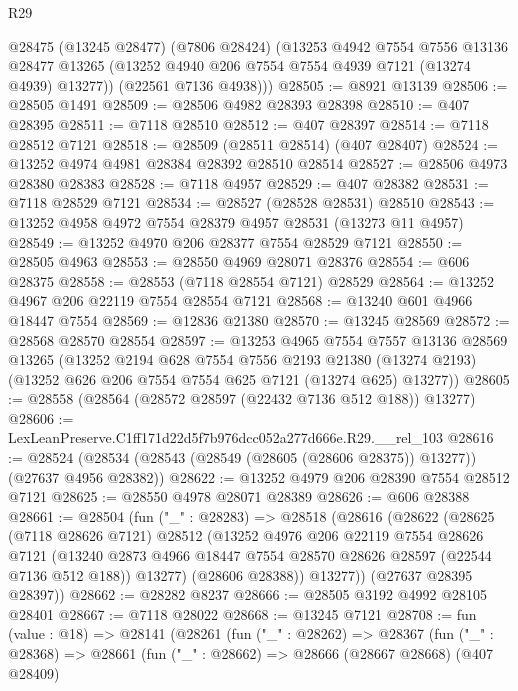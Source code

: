 \begin{lexlean}{R29}
\begin{coremodule}
      @28475
        (@13245 @28477)
        (@7806 @28424)
        (@13253
          @4942
          @7554
          @7556
          @13136
          @28477
          @13265
          (@13252 @4940 @206 @7554 @7554 @4939 @7121 (@13274 @4939) @13277))
        (@22561 @7136 @4938)))
@28505 := @8921 @13139
@28506 := @28505 @1491
@28509 := @28506 @4982 @28393 @28398
@28510 := @407 @28395
@28511 := @7118 @28510
@28512 := @407 @28397
@28514 := @7118 @28512 @7121
@28518 := @28509 (@28511 @28514) (@407 @28407)
@28524 := @13252 @4974 @4981 @28384 @28392 @28510 @28514
@28527 := @28506 @4973 @28380 @28383
@28528 := @7118 @4957
@28529 := @407 @28382
@28531 := @7118 @28529 @7121
@28534 := @28527 (@28528 @28531) @28510
@28543 := @13252 @4958 @4972 @7554 @28379 @4957 @28531 (@13273 @11 @4957)
@28549 := @13252 @4970 @206 @28377 @7554 @28529 @7121
@28550 := @28505 @4963
@28553 := @28550 @4969 @28071 @28376
@28554 := @606 @28375
@28558 := @28553 (@7118 @28554 @7121) @28529
@28564 := @13252 @4967 @206 @22119 @7554 @28554 @7121
@28568 := @13240 @601 @4966 @18447 @7554
@28569 := @12836 @21380
@28570 := @13245 @28569
@28572 := @28568 @28570 @28554
@28597 := @13253
    @4965
    @7554
    @7557
    @13136
    @28569
    @13265
    (@13252
      @2194
      @628
      @7554
      @7556
      @2193
      @21380
      (@13274 @2193)
      (@13252 @626 @206 @7554 @7554 @625 @7121 (@13274 @625) @13277))
@28605 := @28558 (@28564 (@28572 @28597 (@22432 @7136 @512 @188)) @13277)
@28606 := LexLeanPreserve.C1ff171d22d5f7b976dcc052a277d666e.R29.__rel_103
@28616 := @28524 (@28534 (@28543 (@28549 (@28605 (@28606 @28375)) @13277)) (@27637 @4956 @28382))
@28622 := @13252 @4979 @206 @28390 @7554 @28512 @7121
@28625 := @28550 @4978 @28071 @28389
@28626 := @606 @28388
@28661 := @28504
    (fun ("_" : @28283) =>
    @28518
      (@28616
        (@28622
          (@28625
            (@7118 @28626 @7121)
            @28512
            (@13252
              @4976
              @206
              @22119
              @7554
              @28626
              @7121
              (@13240 @2873 @4966 @18447 @7554 @28570 @28626 @28597 (@22544 @7136 @512 @188))
              @13277)
            (@28606 @28388))
          @13277))
      (@27637 @28395 @28397))
@28662 := @28282 @8237
@28666 := @28505 @3192 @4992 @28105 @28401
@28667 := @7118 @28022
@28668 := @13245 @7121
@28708 := fun (value : @18) =>
  @28141
    (@28261
      (fun ("_" : @28262) =>
      @28367
        (fun ("_" : @28368) =>
        @28661
          (fun ("_" : @28662) =>
          @28666
            (@28667 @28668)
            (@407 @28409)

\end{coremodule}
\end{lexlean}
